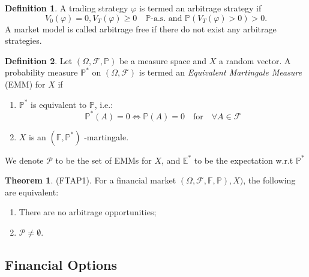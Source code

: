 \documentclass{article}
\theoremstyle{definition}
\newtheorem{definition}{Definition}[section]
\newtheorem{theorem}{Theorem}
\begin{document}
\begin{definition}
    A trading strategy $\varphi$ is termed an arbitrage strategy if 
    $$V_0(\varphi) = 0, V_T(\varphi) \geq 0 \quad \mathbb{P} \text{-a.s. and 
 } \mathbb{P}(V_T(\varphi)>0)>0 .$$
 A market model is called arbitrage free if there do not exist any arbitrage strategies.
\end{definition}

\begin{definition}
    Let $(\Omega, \mathcal{F}, \mathbb{P})$ be a measure space and $X$ a random vector. A probability measure $\mathbb{P}^*$  on $(\Omega, \mathcal{F})$ is termed an \textit{Equivalent Martingale Measure} (EMM) for $X$ if
    \begin{enumerate}
        \item $\mathbb{P}^*$ is equivalent to $\mathbb{P}$, i.e.: $$\mathbb{P}^*(A) = 0 \Leftrightarrow \mathbb{P}(A) = 0 \quad \text{for} \quad \forall A \in \mathcal{F}$$
        \item $X$ is an $(\mathbb{F}, \mathbb{P}^*)$ -martingale.
    \end{enumerate}
    We denote $\mathcal{P}$ to be the set of EMMs for $X$, and $\mathbb{E}^*$ to be the expectation w.r.t $\mathbb{P}^*$
\end{definition}

\begin{theorem}(FTAP1). For a financial market $(\Omega, \mathcal{F}, \mathbb{F}, \mathbb{P}),X)$, the following are equivalent:
\begin{enumerate}
    \item There are no arbitrage opportunities;
    \item $\mathcal{P} \neq \emptyset.$
\end{enumerate}
    
\end{theorem}
\subsection{Financial Options}
\end{document}
